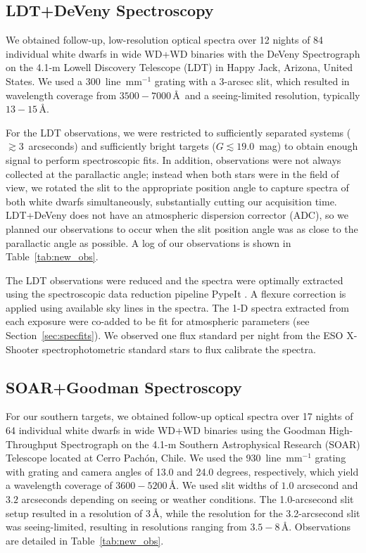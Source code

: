 \documentclass[twocolumn]{aastex631}
\begin{document}
\subsection{LDT+DeVeny Spectroscopy}\label{sec:LDT_reduce}
We obtained follow-up, low-resolution optical spectra over 12 nights of 84 individual white dwarfs in wide WD+WD binaries with the DeVeny Spectrograph \citep{2014SPIE.9147E..2NB} on the 4.1-m Lowell Discovery Telescope (LDT) in Happy Jack, Arizona, United States. We used a 300~line~mm$^{-1}$ grating with a 3-arcsec slit, which resulted in wavelength coverage from $3500-7000$\,\AA\ and a seeing-limited resolution, typically $13-15$\,\AA.

For the LDT observations, we were restricted to sufficiently separated systems ($\gtrsim 3$~arcseconds) and sufficiently bright targets ($G\lesssim 19.0$~mag) to obtain enough signal to perform spectroscopic fits. In addition, observations were not always collected at the parallactic angle; instead when both stars were in the field of view, we rotated the slit to the appropriate position angle to capture spectra of both white dwarfs simultaneously, substantially cutting our acquisition time. LDT+DeVeny does not have an atmospheric dispersion corrector (ADC),  so we planned our observations to occur when the slit position angle was as close to the parallactic angle as possible. A log of our observations is shown in Table~\ref{tab:new_obs}.

The LDT observations were reduced and the spectra were optimally extracted using the spectroscopic data reduction pipeline PypeIt \citep{2020JOSS....5.2308P}. A flexure correction is applied using available sky lines in the spectra. The 1-D spectra extracted from each exposure were co-added to be fit for atmospheric parameters (see Section~\ref{sec:specfits}). We observed one flux standard per night from the ESO X-Shooter spectrophotometric standard stars to flux calibrate the spectra. %

\subsection{SOAR+Goodman Spectroscopy}
For our southern targets, we obtained follow-up optical spectra over 17 nights of 64 individual white dwarfs in wide WD+WD binaries using the Goodman High-Throughput Spectrograph \citep{2004SPIE.5492..331C} on the 4.1-m Southern Astrophysical Research (SOAR) Telescope located at Cerro Pach\'{o}n, Chile. We used the 930~line~mm$^{-1}$ grating with grating and camera angles of 13.0 and 24.0 degrees, respectively, which yield a wavelength coverage of $3600-5200$\,\AA. We used slit widths of $1.0$ arcsecond and $3.2$ arcseconds depending on seeing or weather conditions. The 1.0-arcsecond slit setup resulted in a resolution of 3\,\AA, while the resolution for the 3.2-arcsecond slit was seeing-limited, resulting in resolutions ranging from $3.5-8$\,\AA. Observations are detailed in Table~\ref{tab:new_obs}.
\end{document}
